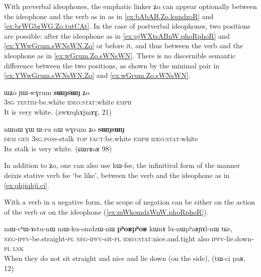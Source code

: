 \documentclass[oldfontcommands,oneside,a4paper,11pt]{article}
\newcommand{\ipa}[1]{{\phon \mbox{#1}}} %
\begin{document}
With preverbal ideophones, the emphatic linker \ipa{ʑo} can appear optionally between the ideophone and the verb as in as in \ref{ex:bAbAB.Zo.kundzoR} and \ref{ex:brWGbrWG.Zo.tutCAt}. In the case of postverbal ideophones, two positions are possible: after the ideophone as in \ref{ex:pjWXtsABnW.phoRphoR} and \ref{ex:YWwGrum.sWNsWN.Zo} or before it, and thus between the verb and the ideophone as in \ref{ex:wGrum.Zo.sWNsWN}. There is no discernible semantic difference between the two positions, as shown by the minimal pair in \ref{ex:YWwGrum.sWNsWN.Zo} and \ref{ex:wGrum.Zo.sWNsWN}.

  \begin{exe}
\ex \label{ex:YWwGrum.sWNsWN.Zo}
\gll 
 \ipa{ɯʑo}  	\ipa{ɲɯ-wɣrum}  	\ipa{\textbf{sɯŋsɯŋ}}  	\ipa{ʑo}  \\
\textsc{3sg} \textsc{testim}-be.white \textsc{ideo:stat}:white  \textsc{emph} \\
\glt It is very white. (zwɤrqhɤjmɤɣ, 21)
\end{exe}
 \begin{exe}
\ex \label{ex:wGrum.Zo.sWNsWN}
\gll 
\ipa{nɯnɯ}  	\ipa{ɣɯ}  	\ipa{ɯ-ru}  	\ipa{nɯ}  	\ipa{wɣrum}  	\ipa{ʑo}  	\ipa{\textbf{sɯŋsɯŋ}}  \\
\textsc{dem} \textsc{gen} \textsc{3sg.poss}-stalk \textsc{top} \textsc{fact}:be.white \textsc{emph} \textsc{ideo:stat}:white \\
\glt Its stalk is very white. (ɕɯrʁaʁ 98)
\end{exe}

In addition to \ipa{ʑo}, one can also use \ipa{kɯ-fse}, the infinitival  form  of the manner deixis stative verb \ipa{fse} `be like', between the verb and the ideophone as in \ref{ex:qhjiqhji.ci}.



With a verb in a negative form, the scope of  negation can be either on the action of the verb or on the ideophone (\ref{ex:mWkomdzWnW.phoRphoR}).

 \begin{exe}
\ex \label{ex:mWkomdzWnW.phoRphoR}
\gll 
 \ipa{mɯ-cʰɯ-ɤstu-nɯ} 	\ipa{mɯ-ku-omdzɯ-nɯ} 	\ipa{\textbf{pʰoʁpʰoʁ}} 	\ipa{kɯnɤ} 	\ipa{lu-nɯpʰaʁɲɤl-nɯ} 	\ipa{tɕe,} \\
\textsc{neg-ipfv}-be.straight-\textsc{pl} \textsc{neg-ipfv}-sit-\textsc{pl} \textsc{ideo:stat}:nice.and.tight
also \textsc{ipfv}-lie.down-\textsc{pl} \textsc{lnk} \\
\glt When they do not sit straight and nice and   lie down (on the side), (tɯ-ci paʁ, 12)
\end{exe}
\end{document}
